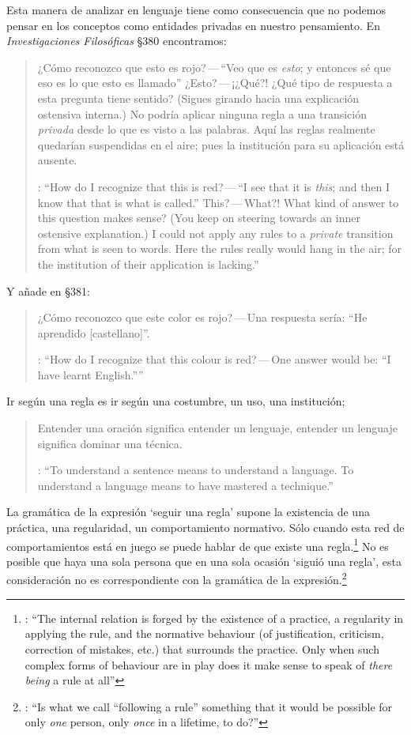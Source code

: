 Esta manera de analizar en lenguaje tiene como consecuencia que no podemos pensar en los conceptos como entidades privadas en nuestro pensamiento. En \emph{Investigaciones Filosóficas} \S380 encontramos: \blockquote[{\cite[\S380]{wittgenstein1953phiinv}}: \enquote{How do I recognize that this is red?\,---\,``I see that it is \emph{this}; and then I know that that is what is called.'' This?\,---\,What?! What kind of answer to this question makes sense? (You keep on steering towards an inner ostensive explanation.) I could not apply any rules to a \emph{private} transition from what is seen to words. Here the rules really would hang in the air; for the institution of their application is lacking.}]{¿Cómo reconozco que esto es rojo?\,---\,``Veo que es \emph{esto}; y entonces sé que eso es lo que esto es llamado'' ¿Esto?\,---\,¡¿Qué?! ¿Qué tipo de respuesta a esta pregunta tiene sentido? (Sigues girando hacia una explicación ostensiva interna.) No podría aplicar ninguna regla a una transición \emph{privada} desde lo que es visto a las palabras. Aquí las reglas realmente quedarían suspendidas en el aire; pues la institución para su aplicación está ausente.}

Y añade en \S381: \blockquote[{\cite[\S380]{wittgenstein1953phiinv}}: \enquote{How do I recognize that this colour is red?\,---\,One answer would be: ``I have learnt English.''}]{¿Cómo reconozco que este color es rojo?\,---\,Una respuesta sería: ``He aprendido [castellano]''.} Ir según una regla es ir según una costumbre, un uso, una institución; \blockquote[{\cite[\S199]{wittgenstein1953phiinv}}: \enquote{To understand a sentence means to understand a language. To understand a language means to have mastered a technique.}]{Entender una oración significa entender un lenguaje, entender un lenguaje significa dominar una técnica.} La gramática de la expresión `seguir una regla' supone la existencia de una práctica, una regularidad, un comportamiento normativo. Sólo cuando esta red de comportamientos está en juego se puede hablar de que existe una regla.\footnote{\cite[Cf.~][p.~14]{bakerhacker2009understanding}: \enquote{The internal relation is forged by the existence of a practice, a regularity in applying the rule, and the normative behaviour (of justification, criticism, correction of mistakes, etc.) that surrounds the practice. Only when such complex forms of behaviour are in play does it make sense to speak of \emph{there being} a rule at all}} No es posible que haya una sola persona que en una sola ocasión `siguió una regla', esta consideración no es correspondiente con la gramática de la expresión.\footnote{\cite[Cf.~][\S199]{wittgenstein1953phiinv}: \enquote{Is what we call ``following a rule'' something that it would be possible for only \emph{one} person, only \emph{once} in a lifetime, to do?}}

